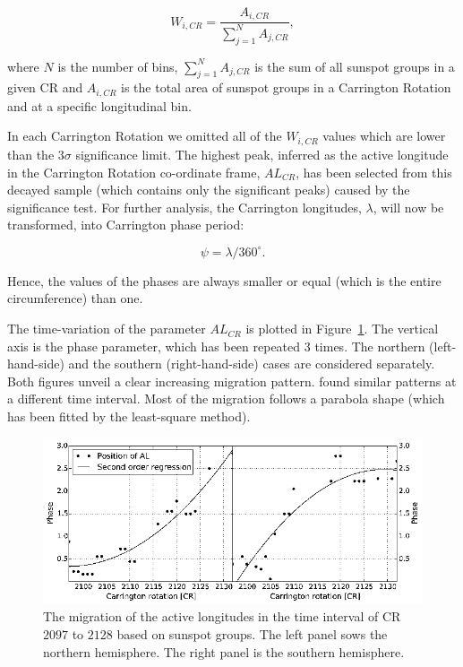 \begin{equation}
W_{i,CR} = \frac{A_{i,CR}}{ \sum_{j=1}^{N} A_{j,CR} },
\end{equation}

where $N$ is the number of bins, $\sum_{j=1}^{N} A_{j,CR}$  is the sum of all sunspot groups in a given CR and $A_{i,CR}$ is the  total area of sunspot groups in a Carrington Rotation and at a specific longitudinal bin.

In each Carrington Rotation we omitted all of the $ W_{i,CR}$ values which are lower than the $3\sigma$ significance limit.
The highest peak, inferred as the active longitude in the Carrington Rotation co-ordinate frame, $AL_{CR}$, has been selected from this decayed sample (which contains only the significant peaks) caused by the significance test.
For further analysis, the Carrington longitudes, $\lambda$, will now be transformed, into Carrington phase period: 

\begin{equation}
\psi = \lambda/360^{\circ}.
\end{equation}

Hence, the values of the phases are always smaller or equal (which is the entire circumference) than one. 

The time-variation of the parameter $AL_{CR}$ is plotted in Figure~\ref{AL}.
The vertical axis is the phase parameter, which has been repeated $3$ times.
The northern (left-hand-side) and the southern (right-hand-side) cases are considered separately. Both figures unveil a clear increasing migration pattern. \cite{Usoskin2005,Gyenge2014} found similar patterns at a different time interval. Most of the migration follows a parabola shape (which has been fitted by the least-square method).

\begin{figure}
	\centering
	\includegraphics[width=128mm]{Chapter4/Figs/AL}
	\caption{The migration of the active longitudes in the time interval of CR $2097$ to $2128$ based on sunspot groups. The left panel sows the northern hemisphere. The right panel is the southern hemisphere.}
	\label{AL}
\end{figure}

